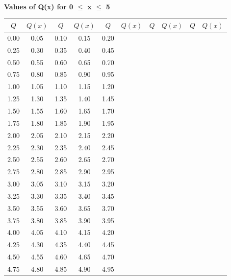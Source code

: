 \documentclass{article}
\begin{document}
\thispagestyle{empty}

\begin{center}
  {\small\textbf{Values of Q(x) for 0 $\le$ x $\le$ 5}}
\end{center}

\begin{center}
\begin{tabular}{|cc||cc||cc||cc||cc|}

	\hline
	 $Q$ & $Q(x)$ & $Q$ & $Q(x)$ & $Q$ & $Q(x)$ & $Q$ & $Q(x)$ & $Q$ & $Q(x)$ \\ \hline 
	 0.00 & 0.05 & 0.10 & 0.15 & 0.20  \\ 
	 0.25 & 0.30 & 0.35 & 0.40 & 0.45  \\ 
	 0.50 & 0.55 & 0.60 & 0.65 & 0.70  \\ 
	 0.75 & 0.80 & 0.85 & 0.90 & 0.95  \\ 
	 1.00 & 1.05 & 1.10 & 1.15 & 1.20  \\ 
	 1.25 & 1.30 & 1.35 & 1.40 & 1.45  \\ 
	 1.50 & 1.55 & 1.60 & 1.65 & 1.70  \\ 
	 1.75 & 1.80 & 1.85 & 1.90 & 1.95  \\ 
	 2.00 & 2.05 & 2.10 & 2.15 & 2.20  \\ 
	 2.25 & 2.30 & 2.35 & 2.40 & 2.45  \\ 
	 2.50 & 2.55 & 2.60 & 2.65 & 2.70  \\ 
	 2.75 & 2.80 & 2.85 & 2.90 & 2.95  \\ 
	 3.00 & 3.05 & 3.10 & 3.15 & 3.20  \\ 
	 3.25 & 3.30 & 3.35 & 3.40 & 3.45  \\ 
	 3.50 & 3.55 & 3.60 & 3.65 & 3.70  \\ 
	 3.75 & 3.80 & 3.85 & 3.90 & 3.95  \\ 
	 4.00 & 4.05 & 4.10 & 4.15 & 4.20  \\ 
	 4.25 & 4.30 & 4.35 & 4.40 & 4.45  \\ 
	 4.50 & 4.55 & 4.60 & 4.65 & 4.70  \\ 
	 4.75 & 4.80 & 4.85 & 4.90 & 4.95  \\ 

\end{tabular}
\end{center}
\end{document}
